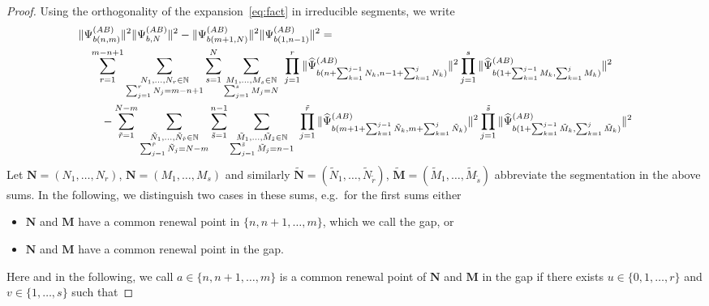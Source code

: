 \documentclass[letterpaper, DIV=17]{scrartcl}
\numberwithin{equation}{section}
\theoremstyle{definition}
\begin{document}
\begin{proof}
Using the orthogonality of the expansion~\eqref{eq:fact} in irreducible segments, we write 
	\begin{align} \label{expansion products}
			&\Vert \Psi_{b(n,m)}^{(AB)} \Vert^2 \Vert \Psi_{b,N}^{(AB)}\Vert^2 - \Vert \Psi_{b(m+1,N)}^{(AB)} \Vert^2 \Vert \Psi_{b(1,n-1)}^{(AB)} \Vert^2  = \\
			& \quad \sum_{r=1}^{m-n+1} \sum_{\substack{N_1, \dots, N_r\in \mathbb{N}\\ \sum_{j=1}^r N_j = m-n+1}} \sum_{s=1}^{N} \sum_{\substack{M_1, \dots, M_s\in \mathbb{N}\\ \sum_{j=1}^s M_j = N}} \ \prod_{j=1}^r \Vert \widehat \Psi_{b(n+\sum_{k=1}^{j-1} N_k, n-1+\sum_{k=1}^j N_k)}^{(AB)} \Vert^2   \prod_{j=1}^s \Vert \widehat \Psi_{b(1+\sum_{k=1}^{j-1} M_k, \sum_{k=1}^j M_k)}^{(AB)} \Vert^2    \notag \\
			&\qquad-\sum_{\tilde{r}=1}^{N-m} \sum_{\substack{\tilde{N}_1, \dots, \tilde{N}_{\tilde{r}}\in \mathbb{N}\\ \sum_{j=1}^{\tilde{r}} \tilde{N}_j = N-m}} \sum_{\tilde{s}=1}^{n-1} \sum_{\substack{\tilde{M}_1, \dots, \tilde{M}_{\tilde{s}}\in \mathbb{N}\\ \sum_{j=1}^{\tilde{s}} \tilde{M}_j = n-1}} \ \prod_{j=1}^{\tilde{r}} \Vert \widehat \Psi_{b(m+1+\sum_{k=1}^{j-1} \tilde{N}_k, m+\sum_{k=1}^j \tilde{N}_k)}^{(AB)} \Vert^2\notag \prod_{j=1}^{\tilde{s}} \Vert \widehat \Psi_{b(1+\sum_{k=1}^{j-1} \tilde{M}_k, \sum_{k=1}^j \tilde{M}_k)}^{(AB)} \Vert^2 \notag
	\end{align}
	Let $\mathbf{N}=(N_1, \dots, N_r)$, $\mathbf{N}=(M_1, \dots, M_s)$ and similarly $\tilde{\mathbf{N}}=(\tilde{N}_1, \dots, \tilde{N}_{\tilde{r}})$, $\tilde{\mathbf{M}}=(\tilde{M}_1, \dots, \tilde{M}_{\tilde{s}})$  abbreviate the segmentation in the above sums. In the following, we distinguish two cases in these sums, e.g.\ for the first sums either 
	\begin{itemize}
	\item   $ \mathbf{N} $ and $ \mathbf{M} $ have a common renewal point in $\{n, n+1, \dots, m\}$, which we call the gap, 
	or
	\item   $ \mathbf{N} $ and $ \mathbf{M} $ have a common renewal point in the gap.
	\end{itemize}
	Here and in the following, we call  $a\in \{n, n+1, \dots, m\}$ 
	 is a common renewal point of  $ \mathbf{N} $ and $ \mathbf{M} $  in the gap if there exists $u\in \{0,1, \dots, r\}$ and $v\in \{1, \dots, s\}$ such that

\end{proof}
\end{document}
